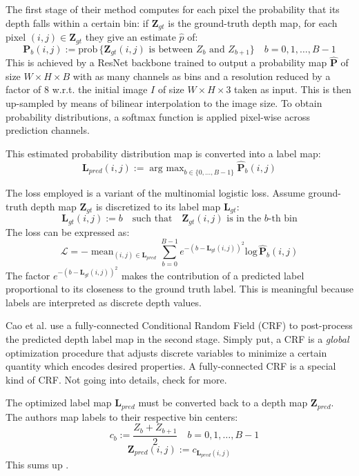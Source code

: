 The first stage of their method computes for each pixel the probability that its depth falls within a certain bin: if $\mathbf{Z}_{gt}$ is the ground-truth depth map, for each pixel $(i,j) \in \mathbf{Z}_{gt}$ they give an estimate $\hat{p}$ of:
\[
	\mathbf{P}_{b}(i,j) := \text{prob} \, \{\mathbf{Z}_{gt}(i,j) \text{ is between } Z_{b} \text{ and } Z_{b+1}\} \quad b = 0, 1, \dotsc, B-1
\]
This is achieved by a ResNet \cite{ResNet} backbone trained to output a probability map $\hat{\mathbf{P}}$ of size $W \times H \times B$ with as many channels as bins and a resolution reduced by a factor of 8 w.r.t. the initial image $I$ of size $W \times H \times 3$ taken as input.
This is then up-sampled by means of bilinear interpolation to the image size.
To obtain probability distributions, a softmax function is applied pixel-wise across prediction channels.

This estimated probability distribution map is converted into a label map:
\[
	\mathbf{L}_{pred}(i, j) := \mathop{\text{arg max}}_{b \in \{ 0, \dotsc, B-1\}} \hat{\mathbf{P}}_{b}(i, j)
\]

The loss employed is a variant of the multinomial logistic loss.
Assume ground-truth depth map $\mathbf{Z}_{gt}$ is discretized to its label map $\mathbf{L}_{gt}$:
\[
	\mathbf{L}_{gt}(i,j) := b	\quad \text{such that} \quad \mathbf{Z}_{gt}(i,j) \text{ is in the } b\text{-th bin}
\]
The loss can be expressed as:
\[
	\mathcal{L} =
		- \mathop{\text{mean}}_{(i,j) \in \mathbf{L}_{pred}}
		\sum_{b = 0}^{B-1}
		e^{-(b - \mathbf{L}_{gt}(i,j))^{2}}
		\text{log} \, \hat{\mathbf{P}}_{b}(i,j)
\]
The factor $e^{-(b - \mathbf{L}_{gt}(i,j))^{2}}$ makes the contribution of a predicted label proportional to its closeness to the ground truth label.
This is meaningful because labels are interpreted as discrete depth values.

Cao et al. use a fully-connected Conditional Random Field (CRF) to post-process the predicted depth label map in the second stage.
Simply put, a CRF is a \textit{global} optimization procedure that adjusts discrete variables to minimize a certain quantity which encodes desired properties.
A fully-connected CRF is a special kind of CRF.
Not going into details, check \cite{computer_vision} for more.

The optimized label map $\mathbf{L}_{pred}$ must be converted back to a depth map $\mathbf{Z}_{pred}$.
The authors map labels to their respective bin centers:
\[
	\quad c_{b} := \frac{Z_{b} + Z_{b+1}}{2} \quad b = 0, 1, \dotsc, B-1
\]\[
	\mathbf{Z}_{pred}(i,j) := c_{\mathbf{L}_{pred}(i,j)}
\]
This sums up \cite{depth_as_classification}.

